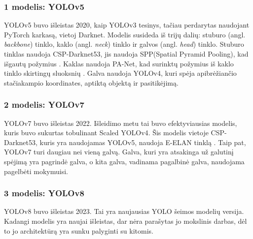 \documentclass{VUMIFPSkursinis}
\begin{document}
\subsubsection{1 modelis: YOLOv5}
YOLOv5 buvo išleistas 2020, kaip YOLOv3 tesinys, tačiau perdarytas naudojant PyTorch karkasą, vietoj Darknet. Modelis susideda iš trijų dalių: stuburo (angl. \emph{backbone}) tinklo, kaklo (angl. \emph{neck}) tinklo ir galvos (angl. \emph{head}) tinklo. Stuburo tinklas naudoja CSP-Darknet53, jis naudoja SPP(Spatial Pyramid Pooling), kad išgautų požymius \cite{DBLP:journals/corr/abs-1911-11929}. Kaklas naudoja PA-Net, kad surinktų požymius iš kaklo tinklo skirtingų sluoksnių \cite{panet}. Galva naudoja YOLOv4, kuri spėja apibrėžiančio stačiakampio koordinates, aptiktą objektą ir pasitikėjimą.

\subsubsection{2 modelis: YOLOv7}
YOLOv7 buvo išleistas 2022. Išleidimo metu tai buvo efektyviausias modelis, kuris buvo sukurtas tobulinant Scaled YOLOv4\cite{scaledyolov4}. Šis modelis vietoje CSP-Darknet53, kuris yra naudojamas YOLOv5, naudoja E-ELAN tinklą \cite{wang2022yolov7}. Taip pat, YOLOv7 turi daugiau nei vieną galvą. Galva, kuri yra atsakinga už galutinį spėjimą yra pagrindė galva, o kita galva, vadinama pagalbinė galva, naudojama pagelbėti mokymuisi.

\subsubsection{3 modelis: YOLOv8}
YOLOv8 buvo išleistas 2023. Tai yra naujausias YOLO šeimos modelių versija. Kadangi modelis yra naujai išleistas, dar nėra parašytas jo mokslinis darbas, dėl to jo architektūrą yra sunku palyginti su kitomis. 
\end{document}
